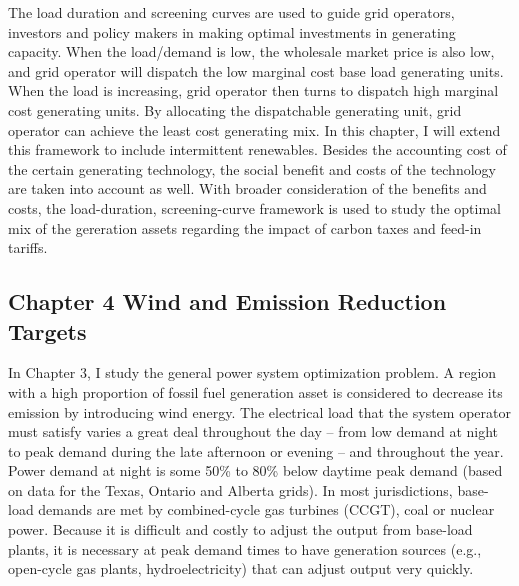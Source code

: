 The \protect\hypertarget{OLE_LINK5}{}{}load duration and screening
curves are used to guide grid operators, investors and policy makers in
making optimal investments in generating capacity. When the load/demand
is low, the wholesale market price is also low, and grid operator will
dispatch the low marginal cost base load generating units. When the load
is increasing, grid operator then turns to dispatch high marginal cost
generating units. By allocating the dispatchable generating unit, grid
operator can achieve the least cost generating mix. In this chapter, I
will extend this framework to include intermittent renewables. Besides
the accounting cost of the certain generating technology, the social
benefit and costs of the technology are taken into account as well. With
broader consideration of the benefits and costs, the load-duration,
screening-curve framework is used to study the optimal mix of the
gereration assets regarding the impact of carbon taxes and feed-in
tariffs.

\subsection{Chapter 4 Wind and Emission Reduction
Targets}\label{chapter-4-wind-and-emission-reduction-targets}

In Chapter 3, I study the general power system optimization problem. A
region with a high proportion of fossil fuel generation asset is
considered to decrease its emission by introducing wind energy. The
electrical load that the system operator must satisfy varies a great
deal throughout the day -- from low demand at night to peak demand
during the late afternoon or evening -- and throughout the year. Power
demand at night is some 50\% to 80\% below daytime peak demand (based on
data for the Texas, Ontario and Alberta grids). In most jurisdictions,
base-load demands are met by combined-cycle gas turbines (CCGT), coal or
nuclear power. Because it is difficult and costly to adjust the output
from base-load plants, it is necessary at peak demand times to have
generation sources (e.g., open-cycle gas plants, hydroelectricity) that
can adjust output very quickly.

